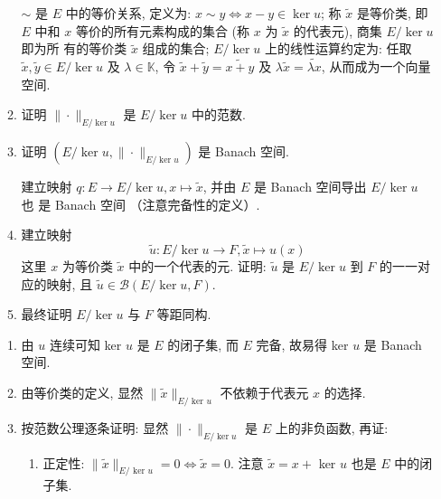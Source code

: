 \begin{enumerate}
\begin{enumerate}
                \begin{remark}
                    $\sim$ 是 $E$ 中的等价关系, 定义为: $x \sim y \Longleftrightarrow x-y \in \operatorname{ker} u$; 称 $\widetilde{x}$ 是等价类, 即 $E$ 中和 $x$ 等价的所有元素构成的集合 (称 $x$ 为 $\widetilde{x}$ 的代表元), 商集 $E / \operatorname{ker} u$ 即为所 有的等价类 $\widetilde{x}$ 组成的集合; $E / \operatorname{ker} u$ 上的线性运算约定为: 任取 $\widetilde{x}, \widetilde{y} \in E / \operatorname{ker} u$ 及 $\lambda \in \mathbb{K}$, 令 $\widetilde{x}+\widetilde{y}=\widetilde{x+y}$ 及 $\lambda \widetilde{x}=\widetilde{\lambda x}$, 从而成为一个向量空间.
                \end{remark}
            \item 证明 $\|\cdot\|_{E / \operatorname{ker} u}$ 是 $E / \operatorname{ker} u$ 中的范数.
            \item 证明 $\left(E / \operatorname{ker} u,\|\cdot\|_{E / \operatorname{ker} u}\right)$ 是 Banach 空间.
                \begin{hint}
                    建立映射 $q: E \rightarrow E / \operatorname{ker} u, x \mapsto \widetilde{x}$, 并由 $E$ 是 Banach 空间导出 $E / \operatorname{ker} u$ 也 是 Banach 空间 （注意完备性的定义）.
                \end{hint}
            \item 建立映射
            \[
            \widetilde{u}: E / \operatorname{ker} u \rightarrow F, \widetilde{x} \mapsto u(x)
            \]
            这里 $x$ 为等价类 $\tilde{x}$ 中的一个代表的元. 证明: $\widetilde{u}$ 是 $E / \operatorname{ker} u$ 到 $F$ 的一一对应的映射, 且 $\widetilde{u} \in \mathcal{B}(E / \operatorname{ker} u, F)$.
            \item 最终证明 $E /\operatorname{ker}u$ 与 $F$ 等距同构.
        \end{enumerate}
        \begin{enumerate}
            \item 由 $u$ 连续可知 ker $u$ 是 $E$ 的闭子集, 而 $E$ 完备, 故易得 ker $u$ 是 Banach 空间.
            \item 由等价类的定义, 显然 $\|\widetilde{x}\|_{E / \text { ker } u}$ 不依赖于代表元 $x$ 的选择.
            \item 按范数公理逐条证明: 显然 $\|\cdot\|_{E / \operatorname{ker} u}$ 是 $E$ 上的非负函数, 再证:
                \begin{enumerate}
                    \item 正定性: $\|\widetilde{x}\|_{E / \text { ker } u}=0 \Leftrightarrow \widetilde{x}=0$. 注意 $\widetilde{x}=x+$ ker $u$ 也是 $E$ 中的闭子集.

\end{enumerate}
\end{enumerate}
\end{enumerate}
